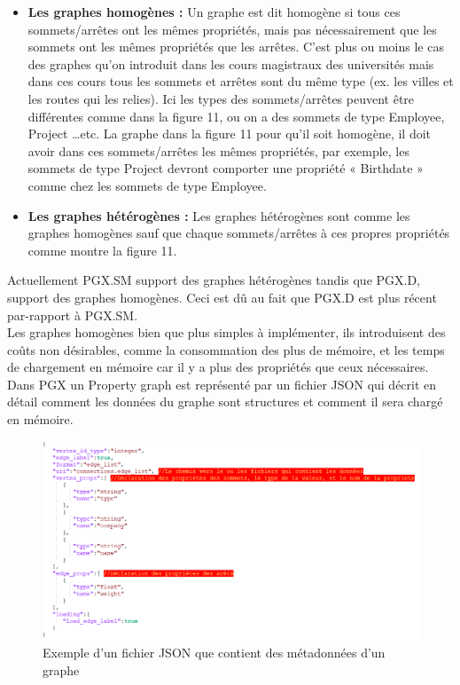 \begin{itemize}[label=\textbullet]
\item  \textbf{Les graphes homogènes :}
Un graphe est dit homogène si tous ces sommets/arrêtes ont les mêmes propriétés, mais pas nécessairement que les sommets ont les mêmes propriétés que les arrêtes. C’est plus ou moins le cas des graphes qu’on introduit dans les cours magistraux des universités mais dans ces cours tous les sommets et arrêtes sont du même type (ex. les villes et les routes qui les relies). Ici les types des sommets/arrêtes peuvent être différentes comme dans la figure 11, ou on a des sommets de type Employee, Project …etc. La graphe dans la figure 11 pour qu’il soit homogène, il doit avoir dans ces sommets/arrêtes les mêmes propriétés, par exemple, les sommets de type Project devront comporter une propriété « Birthdate » comme chez les sommets de type Employee.
\item  \textbf{Les graphes hétérogènes :}
Les graphes hétérogènes sont comme les graphes homogènes sauf que chaque sommets/arrêtes à ces propres propriétés comme montre la figure 11.
\end{itemize}

Actuellement PGX.SM support des graphes hétérogènes tandis que PGX.D, support des graphes homogènes. Ceci est dû au fait que PGX.D est plus récent par-rapport à PGX.SM.\\
Les graphes homogènes bien que plus simples à implémenter, ils introduisent des coûts non désirables, comme la consommation des plus de mémoire, et les temps de chargement en mémoire car il y a plus des propriétés que ceux nécessaires.\\
\newpage
Dans PGX un Property graph est représenté par un fichier JSON qui décrit en détail comment les données du graphe sont structures et comment il sera chargé en mémoire.\\

\begin{figure}[H]  
  \centering
    \includegraphics[width=1.15\textwidth]{chapitre2/Figures/GraphJSON.PNG}
  \caption{Exemple d'un fichier JSON que contient des métadonnées d'un graphe}
\end{figure}